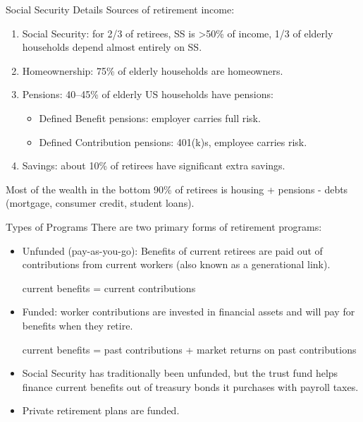 \documentclass[8pt]{extarticle}
\begin{document}
\begin{problem}{Social Security Details}
    Sources of retirement income:
    \begin{enumerate}[(1)]
      \item Social Security: for 2/3 of retirees, SS is >50\% of income, 1/3 of elderly households depend almost entirely on SS.
      \item Homeownership: 75\% of elderly households are homeowners.
      \item Pensions: 40--45\% of elderly US households have pensions:
        \begin{itemize}
          \item Defined Benefit pensions: employer carries full risk.
          \item Defined Contribution pensions: 401(k)s, employee carries risk.
        \end{itemize}
      \item Savings: about 10\% of retirees have significant extra savings.
    \end{enumerate}
    Most of the wealth in the bottom 90\% of retirees is housing + pensions - debts (mortgage, consumer credit, student loans).
  \end{problem}
  \begin{problem}{Types of Programs}
    There are two primary forms of retirement programs:
    \begin{itemize}
      \item Unfunded (pay-as-you-go): Benefits of current retirees are paid out of contributions from current workers (also known as a generational link).
        \begin{center}
          current benefits = current contributions
        \end{center}
      \item Funded: worker contributions are invested in financial assets and will pay for benefits when they retire.
        \begin{center}
          current benefits = past contributions + market returns on past contributions
        \end{center}
      \item Social Security has traditionally been unfunded, but the trust fund helps finance current benefits out of treasury bonds it purchases with payroll taxes.
      \item Private retirement plans are funded.
    \end{itemize}
  \end{problem}
\end{document}
